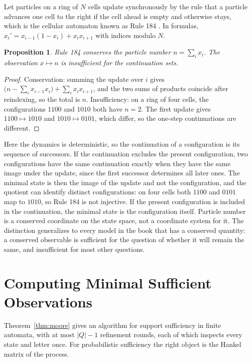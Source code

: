 \documentclass[11pt,oneside]{book}
\newtheorem{proposition}[theorem]{Proposition}
\theoremstyle{definition}
\theoremstyle{remark}
\begin{document}
Let particles on a ring of $N$ cells update synchronously by the rule that a particle advances one cell to the right if the cell ahead is empty and otherwise stays, which is the cellular automaton known as Rule 184 \cite{wolfram1983}. In formulas, $x_i'=x_{i-1}(1-x_i)+x_ix_{i+1}$ with indices modulo $N$.

\begin{proposition}\label{prop:rule184}
Rule 184 conserves the particle number $n=\sum_ix_i$. The observation $x\mapsto n$ is insufficient for the continuation sets.
\end{proposition}

\begin{proof}
Conservation: summing the update over $i$ gives $\bigl(n-\sum_ix_{i-1}x_i\bigr)+\sum_ix_ix_{i+1}$, and the two sums of products coincide after reindexing, so the total is $n$. Insufficiency: on a ring of four cells, the configurations $1100$ and $1010$ both have $n=2$. The first update gives $1100\mapsto1010$ and $1010\mapsto0101$, which differ, so the one-step continuations are different.
\end{proof}

Here the dynamics is deterministic, so the continuation of a configuration is its sequence of successors. If the continuation excludes the present configuration, two configurations have the same continuation exactly when they have the same image under the update, since the first successor determines all later ones. The minimal state is then the image of the update and not the configuration, and the quotient can identify distinct configurations: on four cells both $1100$ and $0101$ map to $1010$, so Rule 184 is not injective. If the present configuration is included in the continuation, the minimal state is the configuration itself. Particle number is a conserved coordinate on the state space, not a coordinate system for it. The distinction generalizes to every model in the book that has a conserved quantity: a conserved observable is sufficient for the question of whether it will remain the same, and insufficient for most other questions.

\chapter{Computing Minimal Sufficient Observations}\label{ch:computing}

Theorem~\ref{thm:moore} gives an algorithm for support sufficiency in finite automata, with at most $|Q|-1$ refinement rounds, each of which inspects every state and letter once. For probabilistic sufficiency the right object is the Hankel matrix of the process.
\end{document}
